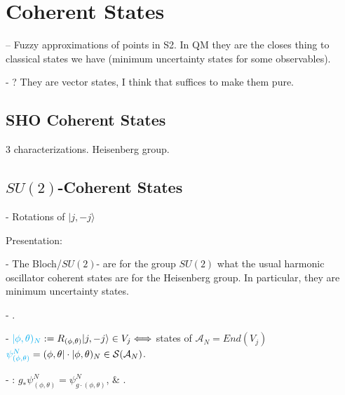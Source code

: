 \linea

\section{Coherent States}

-- Fuzzy approximations of points in S2. In QM they are the closes thing to classical states we have (minimum uncertainty states for some observables).

- ? They are vector states, I think that suffices to make them pure.

\subsection{SHO Coherent States}

3 characterizations. Heisenberg group.
\subsection{$SU(2)$-Coherent States}

 - Rotations of $|j, -j \rangle$
 
Presentation:

- The Bloch/$SU(2)$- are for the group $SU(2)$ what the usual harmonic oscillator coherent states are for the Heisenberg group. In particular, they are minimum uncertainty states. 

- .

-  $\lbtext{|\phi, \theta)_N} := R_{(\phi, \theta)}|j, -j\rangle \in V_j \Longleftrightarrow $ states of $\mathcal A_N = End(V_j)$ $\lbtext{\psi^N_{(\phi, \theta)}} = (\phi, \theta| \cdot |\phi, \theta)_N \in \mathcal S(\mathcal A_N)$. 

- : $g_* \psi^N_{(\phi, \theta)} = \psi^N_{g\cdot (\phi, \theta)}$, \& .

